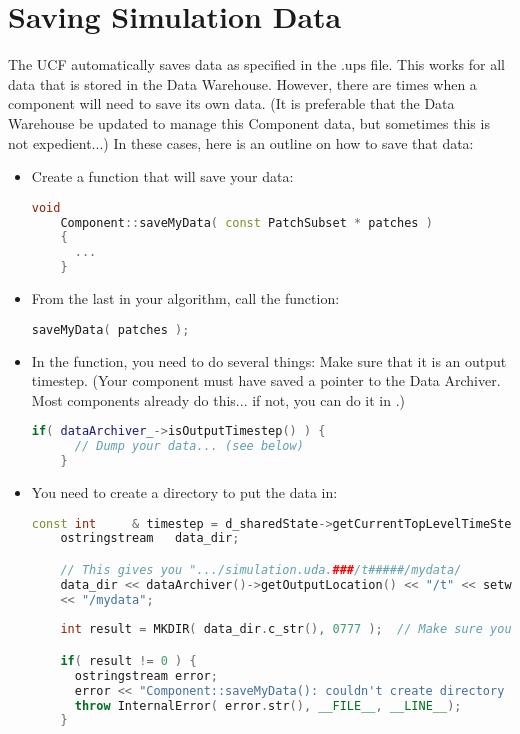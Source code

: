 \chapter{Saving Simulation Data}
The UCF automatically saves data as specified in the .ups file.  This
works for all data that is stored in the Data Warehouse.  However,
there are times when a component will need to save its own data.  (It
is preferable that the Data Warehouse be updated to manage this
Component data, but sometimes this is not expedient...)  In these
cases, here is an outline on how to save that data:

\begin{itemize}
\item Create a function that will save your data:
  \begin{lstlisting}[language=Cpp]
    void
    Component::saveMyData( const PatchSubset * patches )
    {
      ...
    }
  \end{lstlisting}
\item From the last  in your algorithm, call the function:
  \begin{lstlisting}[language=Cpp]
    saveMyData( patches );
  \end{lstlisting}
\item In the function, you need to do several things:
  Make sure that it is an output timestep.  (Your component must have
  saved a pointer to the Data Archiver.  Most components already do
  this... if not, you can do it in .)
  \begin{lstlisting}[language=Cpp]
    if( dataArchiver_->isOutputTimestep() ) {
      // Dump your data... (see below)
    }
  \end{lstlisting}

\item You need to create a directory to put the data in:
  \begin{lstlisting}[language=Cpp]
    const int     & timestep = d_sharedState->getCurrentTopLevelTimeStep();
    ostringstream   data_dir;

    // This gives you ".../simulation.uda.###/t#####/mydata/
    data_dir << dataArchiver()->getOutputLocation() << "/t" << setw(5) << setfill('0') << timestep
    << "/mydata";
    
    int result = MKDIR( data_dir.c_str(), 0777 );  // Make sure you #include <Core/OS/Dir.h>

    if( result != 0 ) {
      ostringstream error;
      error << "Component::saveMyData(): couldn't create directory '") + data_dir.str() + "' (" << result << ").";
      throw InternalError( error.str(), __FILE__, __LINE__);        
    }
  \end{lstlisting}


\end{itemize}

